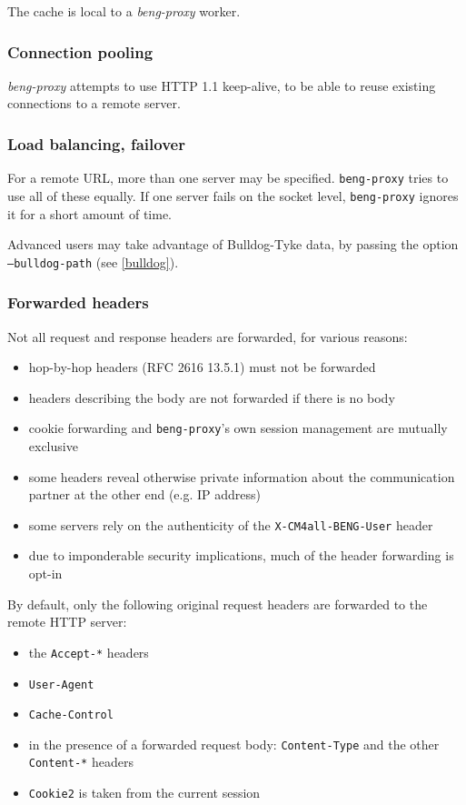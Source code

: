 \documentclass[a4paper,12pt]{article}
\begin{document}
The cache is local to a \emph{beng-proxy} worker.

\subsubsection{Connection pooling}

\emph{beng-proxy} attempts to use HTTP 1.1 keep-alive, to be able to
reuse existing connections to a remote server.

\subsubsection{Load balancing, failover}
\label{balancing}

For a remote URL, more than one server may be specified.
\texttt{beng-proxy} tries to use all of these equally.  If one server
fails on the socket level, \texttt{beng-proxy} ignores it for a short
amount of time.

Advanced users may take advantage of Bulldog-Tyke data, by passing
the option \texttt{--bulldog-path} (see \ref{bulldog}).

\subsubsection{Forwarded headers}

Not all request and response headers are forwarded, for various
reasons:

\begin{itemize}
\item hop-by-hop headers (RFC 2616 13.5.1) must not be forwarded
\item headers describing the body are not forwarded if there is no
  body
\item cookie forwarding and \texttt{beng-proxy}'s own session
  management are mutually exclusive
\item some headers reveal otherwise private information about the
  communication partner at the other end (e.g. IP address)
\item some servers rely on the authenticity of the
  \texttt{X-CM4all-BENG-User} header
\item due to imponderable security implications, much of the header
  forwarding is opt-in
\end{itemize}

By default, only the following original request headers are forwarded
to the remote HTTP server:

\begin{itemize}
\item the \texttt{Accept-*} headers
\item \texttt{User-Agent}
\item \texttt{Cache-Control}
\item in the presence of a forwarded request body:
  \texttt{Content-Type} and the other \texttt{Content-*} headers
\item \texttt{Cookie2} is taken from the current session
\end{itemize}
\end{document}
